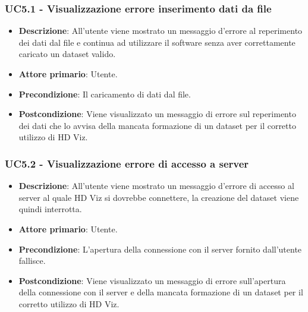 \subsubsection{UC5.1 - Visualizzazione errore inserimento dati da file}
\label{ssub:uc5.1}
\begin{itemize}
    \item \textbf{Descrizione}: All'utente viene mostrato un messaggio d'errore al reperimento
                                dei dati dal file e continua ad utilizzare 
                                il software senza aver correttamente caricato un dataset valido.

    \item \textbf{Attore primario}: Utente.
    
    \item \textbf{Precondizione}:   Il caricamento di dati dal file.

    \item \textbf{Postcondizione}:  Viene visualizzato un messaggio di errore sul reperimento dei 
                                    dati che lo avvisa della mancata formazione di un dataset per il
                                    corretto utilizzo di HD Viz.

\end{itemize}


\subsubsection{UC5.2 - Visualizzazione errore di accesso a server}
\label{ssub:uc5.2}
\begin{itemize}
    \item \textbf{Descrizione}: All'utente viene mostrato un messaggio d'errore di accesso
                                al server al quale HD Viz si dovrebbe connettere, la creazione del dataset viene quindi interrotta.

    \item \textbf{Attore primario}: Utente.
    
    \item \textbf{Precondizione}:   L'apertura della connessione con il server fornito dall'utente fallisce.

    \item \textbf{Postcondizione}:  Viene visualizzato un messaggio di errore sull'apertura della connessione 
                                    con il server e della mancata formazione di un dataset per il corretto utilizzo di HD Viz.

\end{itemize}



